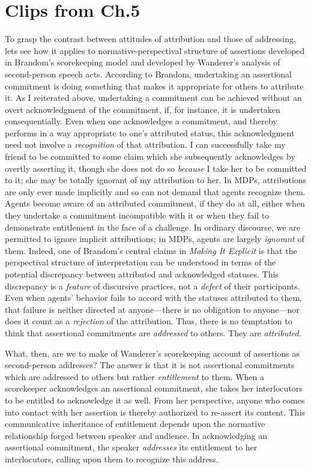 \documentclass{article}                     %
\begin{document}
\section{Clips from \citep{Millson2014} Ch.5}
To grasp the contrast between attitudes of attribution and those of
addressing, lets see how it applies to normative-perspectival structure
of assertions developed in Brandom's scorekeeping model and developed
by Wanderer's analysis of second-person speech acts. According to
Brandom, undertaking an assertional commitment is doing something
that makes it appropriate for others to attribute it. As I reiterated
above, undertaking a commitment can be achieved without an overt acknowledgment
of the commitment, if, for instance, it is undertaken consequentially.
Even when one acknowledges a commitment, and thereby performs in a
way appropriate to one's attributed status, this acknowledgment need
not involve a \emph{recognition} of that attribution. I can successfully
take my friend to be committed to some claim which she subsequently
acknowledges by overtly asserting it, though she does not do so \emph{because}
I take her to be committed to it; she may be totally ignorant of my
attribution to her. In MDPs, attributions are only ever made implicitly
and so can not demand that agents recognize them. Agents become aware
of an attributed commitment, if they do at all, either when they undertake
a commitment incompatible with it or when they fail to demonstrate entitlement
in the face of a challenge. In ordinary discourse, we are permitted
to ignore implicit attributions; in MDPs, agents are largely \emph{ignorant}
of them. Indeed, one of Brandom's central claims in \emph{Making It
Explicit} is that the perspectival structure of interpretation can
be understood in terms of the potential discrepancy between attributed
and acknowledged statuses. This discrepancy is a \emph{feature} of
discursive practices, not a \emph{defect} of their participants. Even
when agents' behavior fails to accord with the statuses attributed
to them, that failure is neither directed at anyone---there is no
obligation to anyone---nor does it count as a \emph{rejection} of
the attribution. Thus, there is no temptation to think that assertional
commitments are \emph{addressed} to others. They are \emph{attributed}.

What, then, are we to make of Wanderer's scorekeeping account of assertions
as second-person addresses? The answer is that it is not assertional
commitments which are addressed to others but rather \emph{entitlement}
to them. When a scorekeeper acknowledges an assertional commitment,
she takes her interlocutors to be entitled to acknowledge it as well.
From her perspective, anyone who comes into contact with her assertion
is thereby authorized to re-assert its content. This communicative
inheritance of entitlement depends upon the normative relationship
forged between speaker and audience. In acknowledging an assertional
commitment, the speaker \emph{addresses} its entitlement to her interlocutors,
calling upon them to recognize this address. 
\end{document}
